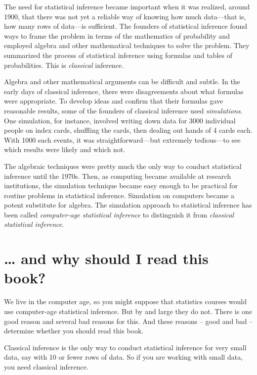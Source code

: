 \documentclass[]{tufte-book}
\begin{document}
The need for statistical inference became important when it was realized, around 1900, that there was not yet a reliable way of knowing how much data---that is, how many rows of data---is sufficient. The founders of statistical inference found ways to frame the problem in terms of the mathematics of probability and employed algebra and other mathematical techniques to solve the problem. They summarized the process of statistical inference using formulas and tables of probabilities. This is \emph{classical} inference.

Algebra and other mathematical arguments can be difficult and subtle. In the early days of classical inference, there were disagreements about what formulas were appropriate. To develop ideas and confirm that their formulas gave reasonable results, some of the founders of classical inference used \emph{simulations}. One simulation, for instance, involved writing down data for 3000 individual people on index cards, shuffling the cards, then dealing out hands of 4 cards each. With 1000 such events, it was straightforward---but extremely tedious---to see which results were likely and which not.

The algebraic techniques were pretty much the only way to conduct statistical inference until the 1970s. Then, as computing became available at research institutions, the simulation technique became easy enough to be practical for routine problems in statistical inference. Simulation on computers became a potent substitute for algebra. The simulation approach to statistical inference has been called \emph{computer-age statistical inference} to distinguish it from \emph{classical statistical inference}.

\hypertarget{and-why-should-i-read-this-book}{%
\section*{\ldots{} and why should I read this book?}\label{and-why-should-i-read-this-book}}

We live in the computer age, so you might suppose that statistics courses would use computer-age statistical inference. But by and large they do not. There is one good reason and several bad reasons for this. And these reasons -- good and bad -- determine whether you should read this book.

Classical inference is the only way to conduct statistical inference for very small data, say with 10 or fewer rows of data. So if you are working with small data, you need classical inference.
\end{document}
